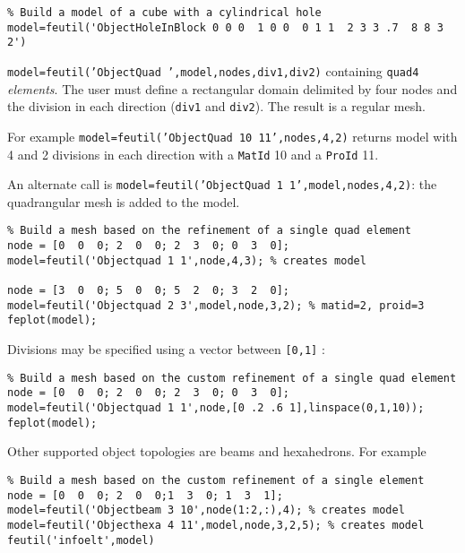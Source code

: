 \begin{verbatim}
% Build a model of a cube with a cylindrical hole
model=feutil('ObjectHoleInBlock 0 0 0  1 0 0  0 1 1  2 3 3 .7  8 8 3 2') 
\end{verbatim}%



{\tt model=feutil('ObjectQuad ',model,nodes,div1,div2)}
 containing {\tt quad4} {\sl elements}. The user must define a rectangular domain delimited by four nodes and the division in each direction ({\tt div1} and {\tt div2}). The result is a regular mesh. 

For example {\tt model=feutil('ObjectQuad 10 11',nodes,4,2)} returns model with 4 and 2 divisions in each direction with a {\tt MatId} 10 and a {\tt ProId} 11.

An alternate call is {\tt model=feutil('ObjectQuad 1 1',model,nodes,4,2)}: the quadrangular mesh is added to the model.

\begin{verbatim}
% Build a mesh based on the refinement of a single quad element
node = [0  0  0; 2  0  0; 2  3  0; 0  3  0];
model=feutil('Objectquad 1 1',node,4,3); % creates model 

node = [3  0  0; 5  0  0; 5  2  0; 3  2  0];
model=feutil('Objectquad 2 3',model,node,3,2); % matid=2, proid=3
feplot(model);
\end{verbatim}%


Divisions may be specified using a vector between {\tt [0,1]} :
\begin{verbatim}
% Build a mesh based on the custom refinement of a single quad element
node = [0  0  0; 2  0  0; 2  3  0; 0  3  0];
model=feutil('Objectquad 1 1',node,[0 .2 .6 1],linspace(0,1,10)); 
feplot(model);
\end{verbatim}%


Other supported object topologies are beams and hexahedrons. For example
\begin{verbatim}
% Build a mesh based on the custom refinement of a single element
node = [0  0  0; 2  0  0;1  3  0; 1  3  1];
model=feutil('Objectbeam 3 10',node(1:2,:),4); % creates model 
model=feutil('Objecthexa 4 11',model,node,3,2,5); % creates model 
feutil('infoelt',model)
\end{verbatim}%


